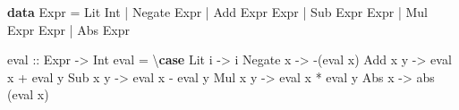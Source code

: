 \documentclass[]{article}
\newenvironment{Shaded}{}{}
\newcommand{\DataTypeTok}[1]{\textcolor[rgb]{0.56,0.13,0.00}{#1}}
\newcommand{\FunctionTok}[1]{\textcolor[rgb]{0.02,0.16,0.49}{#1}}
\newcommand{\KeywordTok}[1]{\textcolor[rgb]{0.00,0.44,0.13}{\textbf{#1}}}
\newcommand{\NormalTok}[1]{#1}
\newcommand{\OperatorTok}[1]{\textcolor[rgb]{0.40,0.40,0.40}{#1}}
\newcommand{\OtherTok}[1]{\textcolor[rgb]{0.00,0.44,0.13}{#1}}
\begin{document}
\begin{Shaded}
\begin{Highlighting}[]
\KeywordTok{data} \DataTypeTok{Expr} \OtherTok{=}
    \DataTypeTok{Lit} \DataTypeTok{Int}
  \OperatorTok{|} \DataTypeTok{Negate} \DataTypeTok{Expr}
  \OperatorTok{|} \DataTypeTok{Add} \DataTypeTok{Expr} \DataTypeTok{Expr}
  \OperatorTok{|} \DataTypeTok{Sub} \DataTypeTok{Expr} \DataTypeTok{Expr}
  \OperatorTok{|} \DataTypeTok{Mul} \DataTypeTok{Expr} \DataTypeTok{Expr}
  \OperatorTok{|} \DataTypeTok{Abs} \DataTypeTok{Expr}

\OtherTok{eval ::} \DataTypeTok{Expr} \OtherTok{{-}\textgreater{}} \DataTypeTok{Int}
\NormalTok{eval }\OtherTok{=}\NormalTok{ \textbackslash{}}\KeywordTok{case}
    \DataTypeTok{Lit}\NormalTok{ i }\OtherTok{{-}\textgreater{}}\NormalTok{ i}
    \DataTypeTok{Negate}\NormalTok{ x }\OtherTok{{-}\textgreater{}} \OperatorTok{{-}}\NormalTok{(eval x)}
    \DataTypeTok{Add}\NormalTok{ x y }\OtherTok{{-}\textgreater{}}\NormalTok{ eval x }\OperatorTok{+}\NormalTok{ eval y}
    \DataTypeTok{Sub}\NormalTok{ x y }\OtherTok{{-}\textgreater{}}\NormalTok{ eval x }\OperatorTok{{-}}\NormalTok{ eval y}
    \DataTypeTok{Mul}\NormalTok{ x y }\OtherTok{{-}\textgreater{}}\NormalTok{ eval x }\OperatorTok{*}\NormalTok{ eval y}
    \DataTypeTok{Abs}\NormalTok{ x }\OtherTok{{-}\textgreater{}} \FunctionTok{abs}\NormalTok{ (eval x)}


\end{Highlighting}
\end{Shaded}
\end{document}
